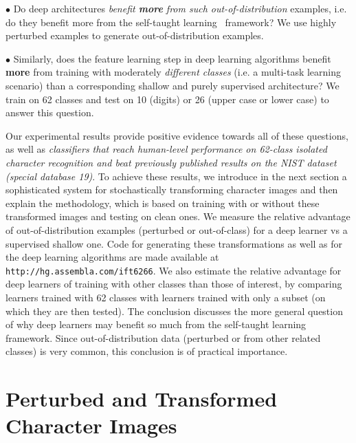 \documentclass{article} %
\begin{document}
$\bullet$ %
Do deep architectures {\em benefit {\bf more} from such out-of-distribution}
examples, i.e. do they benefit more from the self-taught learning~\citep{RainaR2007} framework?
We use highly perturbed examples to generate out-of-distribution examples.

$\bullet$ %
Similarly, does the feature learning step in deep learning algorithms benefit {\bf more}
from training with moderately {\em different classes} (i.e. a multi-task learning scenario) than
a corresponding shallow and purely supervised architecture?
We train on 62 classes and test on 10 (digits) or 26 (upper case or lower case)
to answer this question.

Our experimental results provide positive evidence towards all of these questions,
as well as {\em classifiers that reach human-level performance on 62-class isolated character
recognition and beat previously published results on the NIST dataset (special database 19)}.
To achieve these results, we introduce in the next section a sophisticated system
for stochastically transforming character images and then explain the methodology,
which is based on training with or without these transformed images and testing on 
clean ones. We measure the relative advantage of out-of-distribution examples
(perturbed or out-of-class)
for a deep learner vs a supervised shallow one.
Code for generating these transformations as well as for the deep learning 
algorithms are made available at {\tt http://hg.assembla.com/ift6266}.
We also estimate the relative advantage for deep learners of training with
other classes than those of interest, by comparing learners trained with
62 classes with learners trained with only a subset (on which they
are then tested).
The conclusion discusses
the more general question of why deep learners may benefit so much from 
the self-taught learning framework. Since out-of-distribution data
(perturbed or from other related classes) is very common, this conclusion
is of practical importance.

\section{Perturbed and Transformed Character Images}
\label{s:perturbations}
\end{document}
